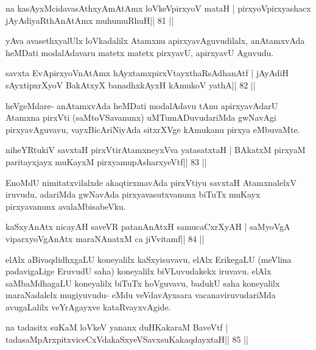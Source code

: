 \begin{shl}
na kasAyxMcidavasAthxyAmAtAmx loVkeV\s pirxyoV mataH |
pirxyoV\s pirxyashacx jAyAdiyaRthA\s nAtAmx muhumuRhuH\hfill || 81 ||
\end{shl}

\begin{artha}
yAva avasethxyalUlx loVkadalilx Atamxnu apirxyavAguvudilalx, anAtamxvAda heMDati modalAdavaru matetx matetx pirxyavU, apirxyavU Aguvudu.
\end{artha}

\begin{shl}
savxta EvApirxyoV\s nAtAmx hAyxtamxpirxVtayxthaRsAdhanAtf |
jAyAdiH sAyxtipxrXyoV BakAtxyX banadhxkAyxH kAmukoV yathA\hfill || 82 ||
\end{shl}

\begin{artha}
heVgeMdare- anAtamxvAda heMDati modalAdavu tAnu apirxyavAdarU Atamxna pirxVti (saMtoVSavanunx) uMTumADuvudariMda gwNavAgi pirxyavAguvavu, vayxBicAriNiyAda sitxrXVge kAmukanu pirxya eMbuvaMte.
\end{artha}

\begin{shl}
niheYRtukiV savxtaH pirxVtirAtamxneyxVva yatasatxtaH |
BAkatxM pirxyaM paritayxjayx muKayxM pirxyamupAsharxyeVtf\hfill || 83 ||
\end{shl}

\begin{artha}
EnoMdU nimitatxvilalxde akaqtirxmavAda pirxVtiyu savxtaH AtamxnalelxV iruvudu, adariMda gwNavAda pirxyavasutxvanunx biTuTx muKayx pirxyavanunx avalaMbisabeVku.
\end{artha}

\begin{shl}
kaSxyAnAtx nicayAH saveVR patanAnAtxH samucaCxrXyAH |
saMyoVgA viparxyoVgAnAtx maraNAnatxM ca jiVvitamf\hfill || 84 ||
\end{shl}

\begin{artha}
elAlx aBivaqdidhxgaLU koneyalilx kaSxyisuvavu, elAlx ErikegaLU (meVlina
padavigaLige EruvudU saha) koneyalilx biVLuvudakekx iruvavu. elAlx
saMbaMdhagaLU koneyalilx biTuTx hoVguvavu, badukU saha koneyalilx
maraNadalelx mugiyuvudu- eMdu veVdavAyxsara vacanaviruvudariMda
avugaLalilx veYrAgayxve kataRvayxvAgide.
\end{artha}

\begin{shl}
na tadasitx suKaM loVkeV yananx duHKakaraM BaveVtf |
tadasaMpArxpitxviceCxVdakaSxyeVSavxsuKakaqdayxtaH\hfill || 85 ||
\end{shl}

